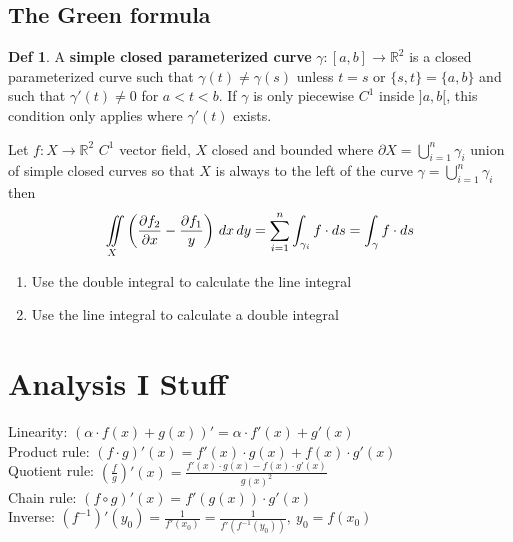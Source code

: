 \documentclass[a4paper, 10pt]{article}
\theoremstyle{definition}
\newtheorem*{definition}{Def}
\newcommand{\R}{\mathbb{R}}
\begin{document}
\pagebreak
\subsection{The Green formula}

\begin{definition}
    A \textbf{simple closed parameterized curve} \(\gamma:[a, b] \to \R^2\) is a closed parameterized curve such that \(\gamma(t) \neq \gamma(s)\) unless \(t = s\) or \(\{s, t\} = \{a, b\}\) and such that \(\gamma'(t) \neq 0\) for \(a < t < b\). If \(\gamma\) is only piecewise \(C^1\) inside \(]a, b[\), this condition only applies where \(\gamma'(t)\) exists.
\end{definition}

\begin{ntheorem*}
    Let \(f: X \to \R^2\) \(C^1\) vector field, \(X\) closed and bounded where \(\partial X = \bigcup_{i = 1}^n \gamma_i\) union of simple closed curves so that \(X\)  is always to the left of the curve \(\gamma = \bigcup_{i = 1}^n \gamma_i\) then
    \[\iint\displaylimits_{X} \left(\frac{\partial f_2}{\partial x} - \frac{\partial f_1}{y}\right) \, dx \, dy = \sum_{i =1}^n \int_{\gamma_i} f \cdot ds = \int_\gamma f \cdot ds\]
\end{ntheorem*}

\begin{note*}
    \begin{enumerate}
        \item Use the double integral to calculate the line integral
        \item Use the line integral to calculate a double integral
    \end{enumerate}
\end{note*}

\pagebreak
\section*{Analysis I Stuff}
\begin{ntheorem*}
    Linearity: \((\alpha \cdot f(x) + g(x))' = \alpha \cdot f'(x) + g'(x)\) \\
    Product rule: \((f \cdot g)'(x) = f'(x)\cdot g(x) + f(x)\cdot g'(x)\) \\
    Quotient rule: \(\left(\frac{f}{g}\right)'(x) = \frac{f'(x)\cdot g(x) - f(x)\cdot g'(x)}{g(x)^2}\) \\
    Chain rule: \((f \circ g)'(x) = f'(g(x))\cdot g'(x)\) \\
    Inverse: \((f^{-1})'(y_0) = \frac{1}{f'(x_0)} = \frac{1}{f'(f^{-1}(y_0))}, \ y_0 = f(x_0)\)
\end{ntheorem*}
\end{document}
